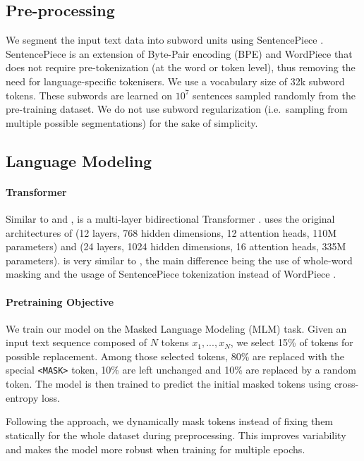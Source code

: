 \subsection{Pre-processing}
We segment the input text data into subword units using SentencePiece \citep{kudo-richardson-2018-sentencepiece}. SentencePiece is an extension of Byte-Pair encoding (BPE) \citep{sennrich-etal-2016-neural} and WordPiece \citep{kudo-2018-subword} that does not require pre-tokenization (at the word or token level), thus removing the need for language-specific tokenisers. We use a vocabulary size of 32k subword tokens. These subwords are learned on $10^7$ sentences sampled randomly from the pre-training dataset.
We do not use subword regularization (i.e.~sampling from multiple possible segmentations) for the sake of simplicity.


\subsection{Language Modeling}

\paragraph{Transformer}
Similar to \roberta and \bert, \camembert is a multi-layer bidirectional Transformer \citep{vaswani-etal-2017-attention}. \camembert uses the original architectures of \bertbase (12 layers, 768 hidden dimensions, 12 attention heads, 110M parameters) and \bertlarge (24 layers, 1024 hidden dimensions, 16 attention heads, 335M parameters). \camembert is very similar to \roberta, the main difference being the use of whole-word masking and the usage of SentencePiece tokenization \citep{kudo-richardson-2018-sentencepiece} instead of WordPiece \citep{schuster-nakajima-2012-japanese}.

\paragraph{Pretraining Objective}
We train our model on the Masked Language Modeling (MLM) task.
Given an input text sequence composed of $N$ tokens $x_1, ..., x_N$, we select 15\% of tokens for possible replacement. Among those selected tokens, 80\% are replaced with the special \texttt{<MASK>} token, 10\% are left unchanged and 10\% are replaced by a random token. The model is then trained to predict the initial masked tokens using cross-entropy loss.

Following the \roberta approach, we dynamically mask tokens instead of fixing them statically for the whole dataset during preprocessing. This improves variability and makes the model more robust when training for multiple epochs.

